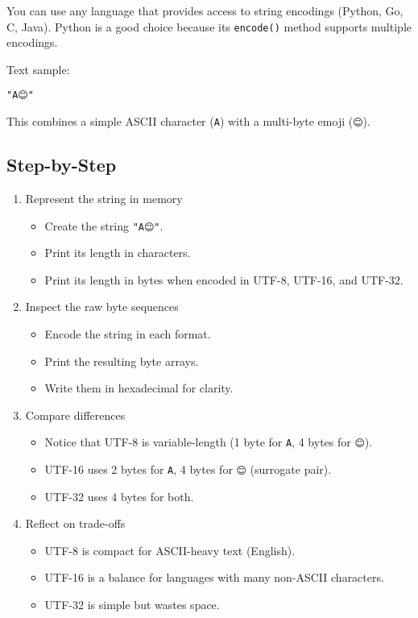 \documentclass[
  letterpaper,
  DIV=11,
  numbers=noendperiod]{scrreprt}
\providecommand{\tightlist}{%
  \setlength{\itemsep}{0pt}\setlength{\parskip}{0pt}}
\begin{document}
You can use any language that provides access to string encodings
(Python, Go, C, Java). Python is a good choice because its
\texttt{encode()} method supports multiple encodings.

Text sample:

\begin{verbatim}
"A😊"
\end{verbatim}

This combines a simple ASCII character (\texttt{A}) with a multi-byte
emoji (\texttt{😊}).

\subsection{Step-by-Step}\label{step-by-step}

\begin{enumerate}
\def\labelenumi{\arabic{enumi}.}
\item
  Represent the string in memory

  \begin{itemize}
  \tightlist
  \item
    Create the string \texttt{"A😊"}.
  \item
    Print its length in characters.
  \item
    Print its length in bytes when encoded in UTF-8, UTF-16, and UTF-32.
  \end{itemize}
\item
  Inspect the raw byte sequences

  \begin{itemize}
  \tightlist
  \item
    Encode the string in each format.
  \item
    Print the resulting byte arrays.
  \item
    Write them in hexadecimal for clarity.
  \end{itemize}
\item
  Compare differences

  \begin{itemize}
  \tightlist
  \item
    Notice that UTF-8 is variable-length (1 byte for \texttt{A}, 4 bytes
    for \texttt{😊}).
  \item
    UTF-16 uses 2 bytes for \texttt{A}, 4 bytes for \texttt{😊}
    (surrogate pair).
  \item
    UTF-32 uses 4 bytes for both.
  \end{itemize}
\item
  Reflect on trade-offs

  \begin{itemize}
  \tightlist
  \item
    UTF-8 is compact for ASCII-heavy text (English).
  \item
    UTF-16 is a balance for languages with many non-ASCII characters.
  \item
    UTF-32 is simple but wastes space.
  \end{itemize}
\end{enumerate}
\end{document}
